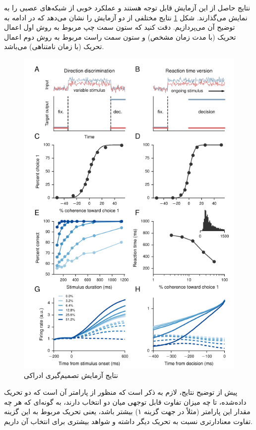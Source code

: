 \documentclass[a4paper]{article}
\begin{document}
نتایج حاصل از این آزمایش قابل توجه هستند و عملکرد خوبی از شبکه‌های عصبی را به نمایش می‌گذارند. شکل  \ref{fig04} نتایج مختلفی از دو آزمایش را نشان می‌دهد که در ادامه به توضیح آن می‌پردازیم. دقت کنید که ستون سمت چپ مربوط به روش اول اعمال تحریک (با مدت زمان مشخص) و ستون سمت راست مربوط به روش دوم اعمال تحریک (با زمان نامتناهی) می‌باشد.

\begin{figure}[h!]
	\centering
	\includegraphics[scale=0.5]{fig04.png}
	\caption{نتایج آزمایش تصمیم‌گیری ادراکی}
	\label{fig04}
\end{figure}
پیش از توضیح نتایج، لازم به ذکر است که منظور از پارامتر 
آن است که دو تحریک داده‌شده،‌ تا چه میزان تفاوت قابل توجهی میان دو انتخاب دارند، به گونه‌ای که هر چه مقدار این پارامتر (مثلاً در جهت گزینه ۱) بیشتر باشد، یعنی تحریک مربوط به این گزینه تفاوت معنادارتری نسبت به تحریک دیگر داشته و شواهد بیشتری برای انتخاب آن داریم.\\
\end{document}
